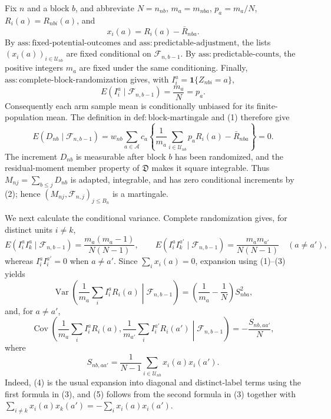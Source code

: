 Fix \(n\) and a block \(b\), and abbreviate \(N=n_{nb}\), \(m_a=m_{nba}\), \(p_a=m_a/N\), \(R_i(a)=R_{nbi}(a)\), and
\[
x_i(a)=R_i(a)-\bar R_{nba}.
\]
By \(\mathrm{ass:fixed\text{-}potential\text{-}outcomes}\) and \(\mathrm{ass:predictable\text{-}adjustment}\), the lists \((x_i(a))_{i\in\mathcal U_{nb}}\) are fixed conditional on \(\mathcal F_{n,b-1}\). By \(\mathrm{ass:predictable\text{-}counts}\), the positive integers \(m_a\) are fixed under the same conditioning. Finally, \(\mathrm{ass:complete\text{-}block\text{-}randomization}\) gives, with \(I_i^a=\mathbf 1\{Z_{nbi}=a\}\),
\[
E(I_i^a\mid\mathcal F_{n,b-1})=\frac{m_a}{N}=p_a.
\tag{1}
\]
Consequently each arm sample mean is conditionally unbiased for its finite-population mean. The definition in \(\mathrm{def:block\text{-}martingale}\) and (1) therefore give
\[
E(D_{nb}\mid\mathcal F_{n,b-1})
=w_{nb}\sum_{a\in\mathcal A}c_a
\left\{\frac1{m_a}\sum_{i\in\mathcal U_{nb}}p_aR_i(a)-\bar R_{nba}\right\}=0.
\tag{2}
\]
The increment \(D_{nb}\) is measurable after block \(b\) has been randomized, and the residual-moment member property of \(\mathfrak D\) makes it square integrable. Thus \(M_{nj}=\sum_{b\le j}D_{nb}\) is adapted, integrable, and has zero conditional increments by (2); hence \((M_{nj},\mathcal F_{n,j})_{j\le B_n}\) is a martingale.

We next calculate the conditional variance. Complete randomization gives, for distinct units \(i\ne k\),
\[
E(I_i^aI_k^a\mid\mathcal F_{n,b-1})
=\frac{m_a(m_a-1)}{N(N-1)},
\qquad
E(I_i^aI_k^{a'}\mid\mathcal F_{n,b-1})
=\frac{m_am_{a'}}{N(N-1)}\quad(a\ne a'),
\tag{3}
\]
whereas \(I_i^aI_i^{a'}=0\) when \(a\ne a'\). Since \(\sum_i x_i(a)=0\), expansion using (1)--(3) yields
\[
\operatorname{Var}\!\left(\frac1{m_a}\sum_i I_i^aR_i(a)\middle|\mathcal F_{n,b-1}\right)
=\left(\frac1{m_a}-\frac1N\right)S_{nba}^2,
\tag{4}
\]
and, for \(a\ne a'\),
\[
\operatorname{Cov}\!\left(\frac1{m_a}\sum_iI_i^aR_i(a),
\frac1{m_{a'}}\sum_iI_i^{a'}R_i(a')\middle|\mathcal F_{n,b-1}\right)
=-\frac{S_{nb,aa'}}N,
\tag{5}
\]
where
\[
S_{nb,aa'}=\frac1{N-1}\sum_{i\in\mathcal U_{nb}}x_i(a)x_i(a').
\]
Indeed, (4) is the usual expansion into diagonal and distinct-label terms using the first formula in (3), and (5) follows from the second formula in (3) together with
\(\sum_{i\ne k}x_i(a)x_k(a')=-\sum_i x_i(a)x_i(a')\).

